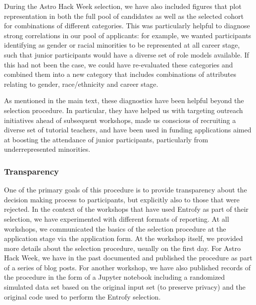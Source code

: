 \documentclass[12pt]{article}
\begin{document}
During the Astro Hack Week selection, we have also included figures that plot representation in both the full pool of candidates as well as the selected cohort for combinations of different categories. This was particularly helpful to diagnose strong correlations in our pool of applicants: for example, we wanted participants identifying as gender or racial minorities to be represented at all career stage, such that junior participants would have a diverse set of role models available. If this had not been the case, we could have re-evaluated these categories and combined them into a new category that includes combinations of attributes relating to gender, race/ethnicity and career stage.

As mentioned in the main text, these diagnostics have been helpful beyond the selection procedure. In particular, they have helped us with targeting outreach initiatives ahead of subsequent workshops, made us conscious of recruiting a diverse set of tutorial teachers, and have been used in funding applications aimed at boosting the attendance of junior participants, particularly from underrepresented minorities. 

\subsubsection*{Transparency}

One of the primary goals of this procedure is to provide transparency about the decision making process to participants, but explicitly also to those that were rejected. 
In the context of the workshops that have used Entrofy as part of their selection, we have experimented with different formats of reporting. At all workshops, we communicated the basics of the selection procedure at the application stage via the application form. At the workshop itself, we provided more details about the selection procedure, usually on the first day. For Astro Hack Week, we have in the past documented and published the procedure as part of a series of blog posts. For another workshop, we have also published records of the procedure in the form of a Jupyter notebook including a randomized simulated data set based on the original input set (to preserve privacy) and the original code used to perform the Entrofy selection. 
\end{document}
